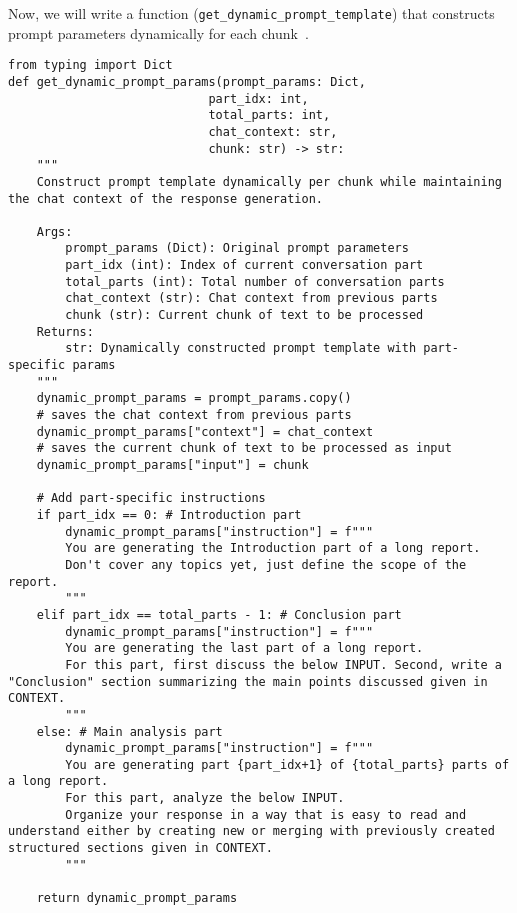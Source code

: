 Now, we will write a function (\texttt{get\_dynamic\_prompt\_template}) that constructs prompt parameters dynamically for each chunk~.

\begin{verbatim}
from typing import Dict
def get_dynamic_prompt_params(prompt_params: Dict, 
                            part_idx: int, 
                            total_parts: int,
                            chat_context: str,
                            chunk: str) -> str:
    """
    Construct prompt template dynamically per chunk while maintaining the chat context of the response generation.
    
    Args:
        prompt_params (Dict): Original prompt parameters
        part_idx (int): Index of current conversation part
        total_parts (int): Total number of conversation parts
        chat_context (str): Chat context from previous parts
        chunk (str): Current chunk of text to be processed
    Returns:
        str: Dynamically constructed prompt template with part-specific params
    """
    dynamic_prompt_params = prompt_params.copy()
    # saves the chat context from previous parts
    dynamic_prompt_params["context"] = chat_context
    # saves the current chunk of text to be processed as input
    dynamic_prompt_params["input"] = chunk
    
    # Add part-specific instructions
    if part_idx == 0: # Introduction part
        dynamic_prompt_params["instruction"] = f"""
        You are generating the Introduction part of a long report.
        Don't cover any topics yet, just define the scope of the report.
        """
    elif part_idx == total_parts - 1: # Conclusion part
        dynamic_prompt_params["instruction"] = f"""
        You are generating the last part of a long report. 
        For this part, first discuss the below INPUT. Second, write a "Conclusion" section summarizing the main points discussed given in CONTEXT.
        """
    else: # Main analysis part
        dynamic_prompt_params["instruction"] = f"""
        You are generating part {part_idx+1} of {total_parts} parts of a long report.
        For this part, analyze the below INPUT.
        Organize your response in a way that is easy to read and understand either by creating new or merging with previously created structured sections given in CONTEXT.
        """
    
    return dynamic_prompt_params
\end{verbatim}
